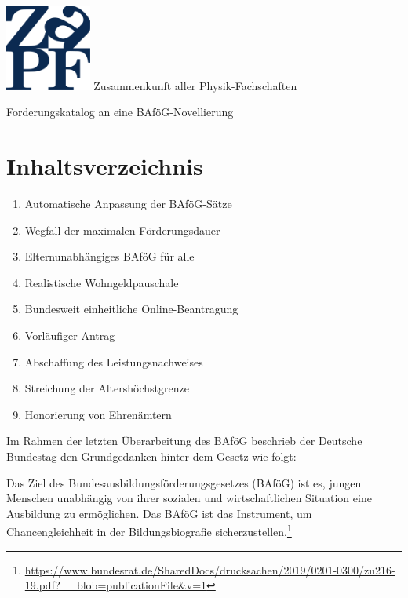 \documentclass[DIV=calc]{scrartcl}
\begin{document}
    \hspace{0.87\textwidth}
    \begin{minipage}{120pt}
        \vspace{-1.8cm}
      \includegraphics[width=80pt]{../logo.pdf}
        \centering
        \small Zusammenkunft aller Physik-Fachschaften
    \end{minipage}
    \begin{center}
        \Huge{Forderungskatalog an eine BAföG-Novellierung}\vspace{.25\baselineskip}\\
        \normalsize
    \end{center}
    \vspace{1cm}

\section*{Inhaltsverzeichnis}
\begin{enumerate}
    \item Automatische Anpassung der BAföG-Sätze
    \item Wegfall der maximalen Förderungsdauer
    \item Elternunabhängiges BAföG für alle
    \item Realistische Wohngeldpauschale
    \item Bundesweit einheitliche Online-Beantragung
    \item Vorläufiger Antrag
    \item Abschaffung des Leistungsnachweises
    \item Streichung der Altershöchstgrenze
    \item Honorierung von Ehrenämtern
\end{enumerate}

\newpage

Im Rahmen der letzten Überarbeitung des BAföG beschrieb der Deutsche Bundestag den Grundgedanken hinter dem Gesetz wie folgt:

\glqq Das Ziel des Bundesausbildungsförderungsgesetzes (BAföG) ist es, jungen Menschen unabhängig von ihrer sozialen und wirtschaftlichen Situation eine Ausbildung zu ermöglichen. Das BAföG ist das Instrument, um Chancengleichheit in der Bildungsbiografie sicherzustellen.\grqq{}\footnote{\url{https://www.bundesrat.de/SharedDocs/drucksachen/2019/0201-0300/zu216-19.pdf?__blob=publicationFile&v=1}}
\end{document}

